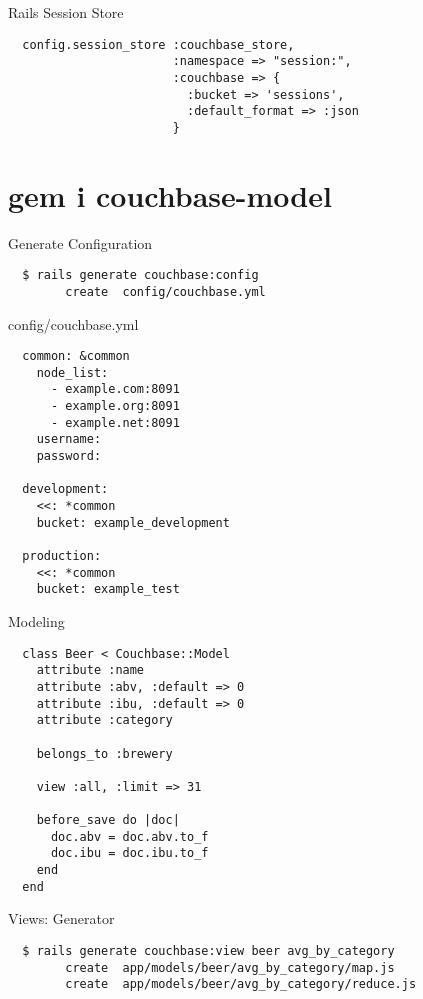 \documentclass[aspectratio=43]{beamer}
\begin{document}
\begin{frame}[fragile]{Rails Session Store}
  \begin{verbatim}
  config.session_store :couchbase_store,
                       :namespace => "session:",
                       :couchbase => {
                         :bucket => 'sessions',
                         :default_format => :json
                       }
  \end{verbatim}
\end{frame}

\section{gem i couchbase-model}
\begin{frame}[fragile]{Generate Configuration}
  \begin{verbatim}
  $ rails generate couchbase:config
        create  config/couchbase.yml
  \end{verbatim}
\end{frame}

\begin{frame}[fragile]{config/couchbase.yml}
  \begin{verbatim}
  common: &common
    node_list:
      - example.com:8091
      - example.org:8091
      - example.net:8091
    username:
    password:

  development:
    <<: *common
    bucket: example_development

  production:
    <<: *common
    bucket: example_test
  \end{verbatim}
\end{frame}

\begin{frame}[fragile]{Modeling}
  \begin{verbatim}
  class Beer < Couchbase::Model
    attribute :name
    attribute :abv, :default => 0
    attribute :ibu, :default => 0
    attribute :category

    belongs_to :brewery

    view :all, :limit => 31

    before_save do |doc|
      doc.abv = doc.abv.to_f
      doc.ibu = doc.ibu.to_f
    end
  end
  \end{verbatim}
\end{frame}

\begin{frame}[fragile]{Views: Generator}
  \begin{verbatim}
  $ rails generate couchbase:view beer avg_by_category
        create  app/models/beer/avg_by_category/map.js
        create  app/models/beer/avg_by_category/reduce.js
  \end{verbatim}
\end{frame}
\end{document}
